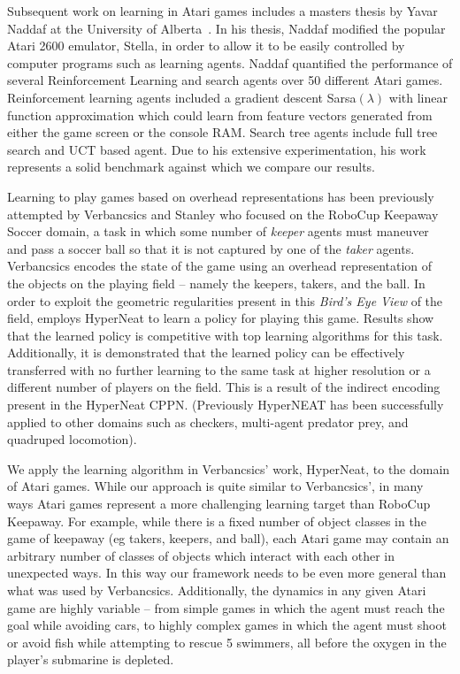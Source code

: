 \documentclass{acm_proc_article-sp}
\begin{document}
Subsequent work on learning in Atari games includes a masters thesis by Yavar Naddaf at the University of Alberta~\cite{naddaf10}. In his thesis, Naddaf modified the popular Atari 2600 emulator, Stella, in order to allow it to be easily controlled by computer programs such as learning agents. Naddaf quantified the performance of several Reinforcement Learning and search agents over 50 different Atari games. Reinforcement learning agents included a gradient descent Sarsa$(\lambda)$ with linear function approximation which could learn from feature vectors generated from either the game screen or the console RAM. Search tree agents include full tree search and UCT based agent. Due to his extensive experimentation, his work represents a solid benchmark against which we compare our results.

Learning to play games based on overhead representations has been previously attempted by Verbancsics and Stanley\cite{verbancsics10} who focused on the RoboCup Keepaway Soccer domain\cite{stone01}, a task in which some number of \textit{keeper} agents must maneuver and pass a soccer ball so that it is not captured by one of the \textit{taker} agents. Verbancsics encodes the state of the game using an overhead representation of the objects on the playing field -- namely the keepers, takers, and the ball. In order to exploit the geometric regularities present in this \textit{Bird's Eye View} of the field, employs HyperNeat to learn a policy for playing this game. Results show that the learned policy is competitive with top learning algorithms for this task. Additionally, it is demonstrated that the learned policy can be effectively transferred with no further learning to the same task at higher resolution or a different number of players on the field. This is a result of the indirect encoding present in the HyperNeat CPPN. (Previously HyperNEAT has been successfully applied to other domains such as checkers\cite{gauci08}, multi-agent predator prey\cite{ambrosio08}, and quadruped locomotion\cite{clune09}). 

We apply the learning algorithm in Verbancsics' work, HyperNeat, to the domain of Atari games. While our approach is quite similar to Verbancsics', in many ways Atari games represent a more challenging learning target than RoboCup Keepaway. For example, while there is a fixed number of object classes in the game of keepaway (eg takers, keepers, and ball), each Atari game may contain an arbitrary number of classes of objects which interact with each other in unexpected ways. In this way our framework needs to be even more general than what was used by Verbancsics. Additionally, the dynamics in any given Atari game are highly variable -- from simple games in which the agent must reach the goal while avoiding cars, to highly complex games in which the agent must shoot or avoid fish while attempting to rescue 5 swimmers, all before the oxygen in the player's submarine is depleted.
\end{document}
